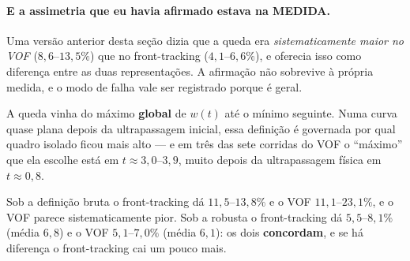 \paragraph{E a assimetria que eu havia afirmado estava na MEDIDA.} Uma vers\~ao
anterior desta se\c{c}\~ao dizia que a queda era \emph{sistematicamente maior no
VOF} ($8{,}6$--$13{,}5\%$) que no front-tracking ($4{,}1$--$6{,}6\%$), e oferecia
isso como diferen\c{c}a entre as duas representa\c{c}\~oes. A afirma\c{c}\~ao
n\~ao sobrevive \`a pr\'opria medida, e o modo de falha vale ser registrado
porque \'e geral.

A queda vinha do m\'aximo \textbf{global} de $w(t)$ at\'e o m\'inimo seguinte.
Numa curva quase plana depois da ultrapassagem inicial, essa defini\c{c}\~ao
\'e governada por qual quadro isolado ficou mais alto --- e em tr\^es das sete
corridas do VOF o ``m\'aximo'' que ela escolhe est\'a em $t \approx 3{,}0$--$3{,}9$,
muito depois da ultrapassagem f\'isica em $t \approx 0{,}8$.

\begin{table}[htbp]
\centering
\caption{A mesma queda sob duas defini\c{c}\~oes, e a dispers\~ao que as separa.}
\label{tab:tridim-queda}
\small
\begin{adjustbox}{max width=\linewidth}
\end{adjustbox}
\end{table}

Sob a defini\c{c}\~ao bruta o front-tracking d\'a $11{,}5$--$13{,}8\%$ e o VOF
$11{,}1$--$23{,}1\%$, e o VOF parece sistematicamente pior. Sob a robusta o
front-tracking d\'a $5{,}5$--$8{,}1\%$ (m\'edia $6{,}8$) e o VOF
$5{,}1$--$7{,}0\%$ (m\'edia $6{,}1$): os dois \textbf{concordam}, e se h\'a
diferen\c{c}a o front-tracking cai um pouco mais.

